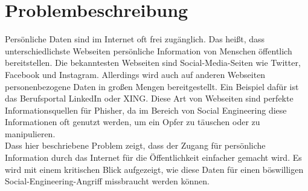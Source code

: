 

\chapter{Problembeschreibung}  %
\label{cha:Problemspezifikation} %
Persönliche Daten sind im Internet oft frei zugänglich. Das heißt, dass unterschiedlichste Webseiten persönliche Information von Menschen öffentlich bereitstellen. Die bekanntesten Webseiten sind Social-Media-Seiten wie Twitter, Facebook und Instagram. Allerdings wird auch auf anderen Webseiten personenbezogene Daten in großen Mengen bereitgestellt. Ein Beispiel dafür ist das Berufsportal LinkedIn oder XING. Diese Art von Webseiten sind perfekte Informationsquellen für Phisher, da im Bereich von Social Engineering diese Informationen oft genutzt werden, um ein Opfer zu täuschen oder zu manipulieren.\\
Dass hier beschriebene Problem zeigt, dass der Zugang für persönliche Information durch das Internet für die Öffentlichkeit einfacher gemacht wird. Es wird mit einem kritischen Blick aufgezeigt, wie diese Daten für einen böswilligen Social-Engineering-Angriff missbraucht werden können.
